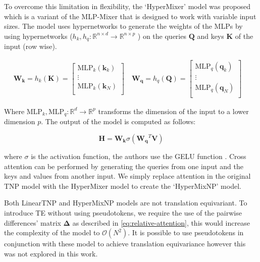 \documentclass[../../main.tex]{subfiles}
\begin{document}
To overcome this limitation in flexibility, the `HyperMixer' \cite{mai2023hypermixer} model was proposed which is a variant of the MLP-Mixer that is designed to work with variable input sizes. The model uses hypernetworks \cite{ha2016hypernetworks} to generate the weights of the MLPs by using hypernetworks ($h_k, h_q : \mathbb{R}^{n \times d} \rightarrow \mathbb{R}^{n \times p}$ ) on the queries $\bm{Q}$ and keys $\bm{K}$ of the input (row wise).

\begin{align}
    \bm{W_k} = h_k(\bm{K}) =  \begin{bmatrix}
        \text{MLP}_k(\bm{k}_k) \\
        \vdots \\
        \text{MLP}_k(\bm{k}_N) \\
    \end{bmatrix} \quad
    \bm{W_q} = h_q(\bm{Q}) =  \begin{bmatrix}
        \text{MLP}_q(\bm{q}_k) \\
        \vdots \\
        \text{MLP}_q(\bm{q}_N) \\
    \end{bmatrix} \quad
\end{align}

Where $\text{MLP}_k, \text{MLP}_q: \mathbb{R}^d \rightarrow \mathbb{R}^p$ transforms the dimension of the input to a lower dimension $p$. The output of the model is computed as follows:

\begin{equation}
    \bm{H} = \bm{W_k} \sigma(\bm{W_q}^T \bm{V})
\end{equation}

where $\sigma$ is the activation function, the authors use the GELU function \cite{hendrycks2023gaussian}.
Cross attention can be performed by generating the queries from one input and the keys and values from another input. We simply replace attention in the original TNP model with the HyperMixer model to create the `HyperMixNP' model. 

\begin{note}
    Both LinearTNP and HyperMixNP models are not translation equivariant. To introduce TE without using pseudotokens, we require the use of the pairwise differences' matrix $\bm{\Delta}$ as described in \autoref{eq:relative-attention}, this would increase the complexity of the model to $\mathcal{O}(N^2)$. It is possible to use pseudotokens in conjunction with these model to achieve translation equivariance however this was not explored in this work.
\end{note}
\end{document}
